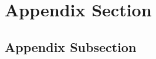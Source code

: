 \documentclass[11pt,conference]{IEEEtran}
\begin{document}






%
%
%



%
%
\appendix

\section{Appendix Section}

\subsection{Appendix Subsection}





\end{document}
